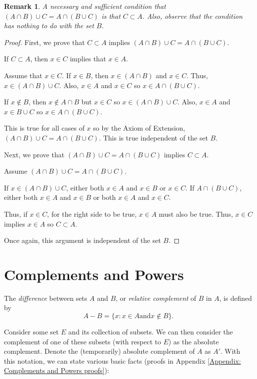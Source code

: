 \documentclass[12pt]{article}
\newtheorem{remark}{Remark}
\begin{document}
\begin{remark}
    A necessary and sufficient condition that $(A \cap B) \cup C = A \cap (B \cup C)$ is that $C \subset A$.
    Also, observe that the condition has nothing to do with the set $B$.
\end{remark}
\begin{proof}
    First, we prove that $C \subset A$ implies $(A \cap B) \cup C = A \cap (B \cup C)$.

    If $C \subset A$, then $x \in C$ implies that $x \in A$.

    Assume that $x \in C$. If $x \in B$, then $x \in (A \cap B)$ and $x \in C$. Thus, $x \in (A \cap B) \cup C$.
    Also, $x \in A$ and $x \in C$ so $x \in A \cap (B \cup C)$.

    If $x \notin B$, then $x \notin A \cap B$ but $x \in C$ so $x \in (A \cap B) \cup C$.
    Also, $x \in A$ and $x \in B \cup C$ so $x \in A \cap(B \cup C)$.

    This is true for all cases of $x$ so by the Axiom of Extension, $(A \cap B) \cup C = A \cap (B \cup C)$.
    This is true independent of the set $B$.

    Next, we prove that $(A \cap B) \cup C = A \cap (B \cup C)$ implies $C \subset A$.

    Assume $(A \cap B) \cup C = A \cap (B \cup C)$.

    If $x \in (A \cap B) \cup C$, either both $x \in A$ and $x \in B$ or $x \in C$.
    If $A \cap (B \cup C)$, either both $x \in A$ and $x \in B$ or both $x \in A$ and $x \in C$.

    Thus, if $x \in C$, for the right side to be true, $x \in A$ must also be true. Thus, $x \in C$ implies $x \in A$
    so $C \subset A$.

    Once again, this argument is independent of the set $B$.
\end{proof}

\section{Complements and Powers}
The \textit{difference} between sets $A$ and $B$, or \textit{relative complement} of $B$ in $A$, is
defined by
\begin{equation}
    A - B = \{x: x \in A \text{and} x \notin B\}.
\end{equation}

Consider some set $E$ and its collection of subsets. We can then consider the complement of one of these
subsets (with respect to $E$) as the absolute complement. Denote the (temporarily) absolute complement of $A$
as $A'$. With this notation, we can state various basic facts (proofs in Appendix \ref{Appendix: Complements and Powers proofs}):
\end{document}
